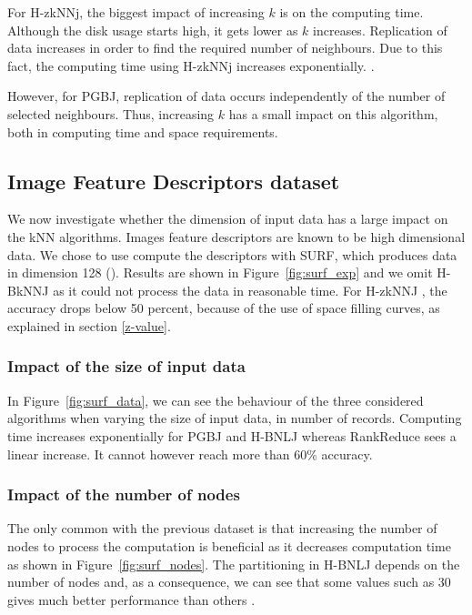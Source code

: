 For H-zkNNj, the biggest impact of increasing $k$ is on the computing time. Although the disk usage starts high, it gets
lower as $k$ increases. Replication of data increases in order to find the required number of neighbours. Due to this fact, the computing time using H-zkNNj increases exponentially. .

However, for PGBJ, replication of data occurs independently of the number of selected neighbours. Thus, increasing $k$ has 
a small impact on this algorithm, both in computing time and space requirements.       
        
\subsection{Image Feature Descriptors dataset}
We now investigate whether the dimension of input data has a large impact on the kNN algorithms. Images feature descriptors 
are known to be high dimensional data. We chose to use compute the descriptors with SURF, which produces data
in dimension 128 (). 
Results are shown in Figure~\ref{fig:surf_exp} and we omit H-BkNNJ as it could not process the data in reasonable time.
For H-zkNNJ , the accuracy drops  below 50 percent, because of the use 
of space filling curves, as explained in section \ref{z-value}. 

\subsubsection{Impact of the size of input data}       
In Figure~\ref{fig:surf_data}, we can see the behaviour of the three considered algorithms when varying the size of input 
data, in number of records. Computing time increases exponentially for PGBJ and H-BNLJ whereas RankReduce sees a linear 
increase. It cannot however reach more than 60\% accuracy.

\subsubsection{Impact of the number of nodes}
The only common with the previous dataset is that increasing the number of nodes to process the computation is beneficial
as it decreases computation time as shown in Figure~\ref{fig:surf_nodes}.
The partitioning in H-BNLJ depends on the number of nodes and, as a consequence, we can see that some values such as 30 gives much better performance than others . 
      

